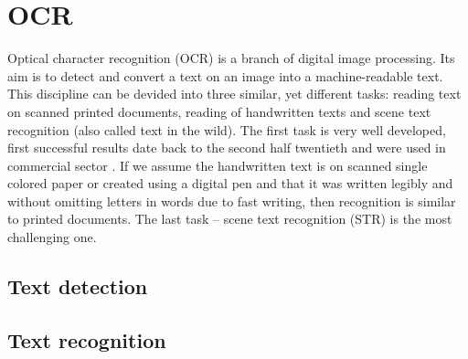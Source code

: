 \chapter{OCR}

Optical character recognition (OCR) is a branch of digital image processing. Its aim is to detect and convert a text on an image into a machine-readable text. This discipline can be devided into three similar, yet different tasks: reading text on scanned printed documents, reading of handwritten texts and scene text recognition (also called text in the wild). The first task is very well developed, first successful results date back to the second half twentieth and were used in commercial sector \cite{ocrhist}. If we assume the handwritten text is on scanned single colored paper or created using a digital pen and that it was written legibly and without omitting letters in words due to fast writing, then recognition is similar to printed documents. The last task -- scene text recognition (STR) is the most challenging one. 

\section{Text detection}

\section{Text recognition}